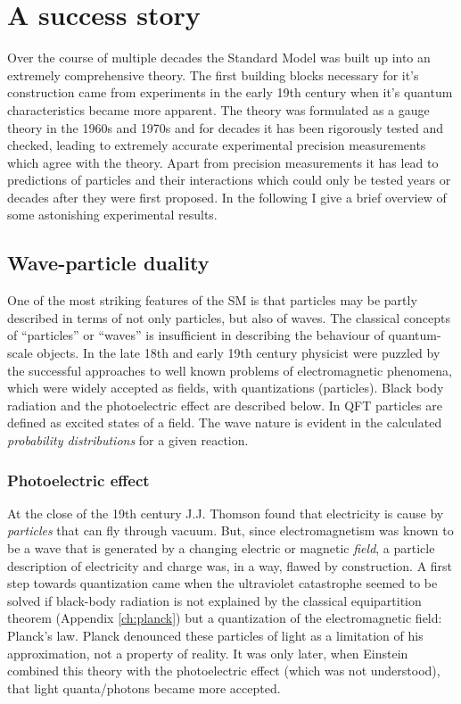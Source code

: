 \section{A success story}
Over the course of multiple decades the Standard Model was built up into an extremely comprehensive theory. The first building blocks necessary for it's construction came from experiments in the early 19th century when it's quantum characteristics became more apparent. The theory was formulated as a gauge theory in the 1960s and 1970s and for decades it has been rigorously tested and checked, leading to extremely accurate experimental precision measurements which agree with the theory. Apart from precision measurements it has lead to predictions of particles and their interactions which could only be tested years or decades after they were first proposed. In the following I give a brief overview of some astonishing experimental results.

\subsection{Wave-particle duality}
One of the most striking features of the SM is that particles may be partly described in terms of not only particles, but also of waves. The classical concepts of ``particles'' or ``waves'' is insufficient in describing the behaviour of quantum-scale objects. In the late 18th and early 19th century physicist were puzzled by the successful approaches to well known problems of electromagnetic phenomena, which were widely accepted as fields, with quantizations (particles). Black body radiation and the photoelectric effect are described below. In QFT particles are defined as excited states of a field. The wave nature is evident in the calculated \textit{probability distributions} for a given reaction.

\subsubsection{Photoelectric effect}
At the close of the 19th century J.J. Thomson found that electricity is cause by \textit{particles} that can fly through vacuum. But, since electromagnetism was known to be a wave that is generated by a changing electric or magnetic \textit{field}, a particle description of electricity and charge was, in a way, flawed by construction. 
A first step towards quantization came when the ultraviolet catastrophe seemed to be solved if black-body radiation is not explained by the classical equipartition theorem (Appendix \ref{ch:planck}) but a quantization of the electromagnetic field: Planck's law. Planck denounced these particles of light as a limitation of his approximation, not a property of reality. It was only later, when Einstein combined this theory with the photoelectric effect (which was not understood), that light quanta/photons became more accepted.

